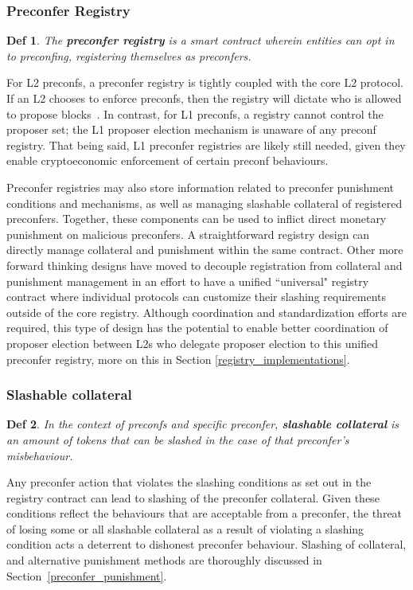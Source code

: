 \documentclass[a4paper]{article}
\theoremstyle{boldstyle}
\newtheorem*{definitionx}{Def}
\newenvironment{definition}
  {\begin{defopenboxq}\begin{definitionx}}
  {\end{definitionx}\end{defopenboxq}}
\begin{document}
        \subsubsection{Preconfer Registry} \label{preconfer_registry}
        \begin{definition}
        The \textbf{preconfer registry} is a smart contract wherein entities can opt in to preconfing, registering themselves as preconfers. 
        \end{definition}
        For L2 preconfs, a preconfer registry is tightly coupled with the core L2 protocol. If an L2 chooses to enforce preconfs, then the registry will dictate who is allowed to propose blocks~\cite{W:SequencerOpt-InDiscoveryandCommunication}. In contrast, for L1 preconfs, a registry cannot control the proposer set; the L1 proposer election mechanism is unaware of any preconf registry. That being said, L1 preconfer registries are likely still needed, given they enable cryptoeconomic enforcement of certain preconf behaviours. 
 
        Preconfer registries may also store information related to preconfer punishment conditions and mechanisms, as well as managing slashable collateral of registered preconfers. Together, these components can be used to inflict direct monetary punishment on malicious preconfers. A straightforward registry design can directly manage collateral and punishment within the same contract. Other more forward thinking designs have moved to decouple registration from collateral and punishment management in an effort to have a unified ``universal" registry contract \cite{W:UniversalRegistryContract} where individual protocols can customize their slashing requirements outside of the core registry. Although coordination and standardization efforts are required, this type of design has the potential to enable better coordination of proposer election between L2s who delegate proposer election to this unified preconfer registry, more on this in Section \ref{registry_implementations}.
         
        \subsubsection{Slashable collateral}
        \begin{definition}
            In the context of preconfs and specific preconfer, \textbf{slashable collateral} is an amount of tokens that can be slashed in the case of that preconfer's misbehaviour. 
        \end{definition} 
        Any preconfer action that violates the slashing conditions as set out in the registry contract can lead to slashing of the preconfer collateral. Given these conditions reflect the behaviours that are acceptable from a preconfer, the threat of losing some or all slashable collateral as a result of violating a slashing condition acts a deterrent to dishonest preconfer behaviour. Slashing of collateral, and alternative punishment methods are thoroughly discussed in Section~\ref{preconfer_punishment}.  
\end{document}
